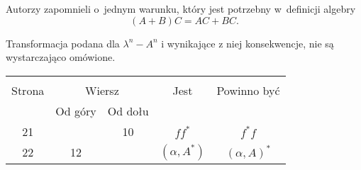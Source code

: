 \documentclass[a4paper,11pt]{article}
\begin{document}


\start {} Autorzy zapomnieli o~jednym warunku, który jest
potrzebny w~definicji algebry
\begin{equation}
  \label{eq:BRVolI-s01-01}
  ( A + B ) C = A C + B C.
\end{equation}

\vspace{\spaceFour}



\start {} Transformacja podana dla $\lambda^{ n } - A^{ n }$ i
wynikające z niej konsekwencje, nie są wystarczająco omówione.

\vspace{\spaceFour}







\begin{center}
  \begin{tabular}{|c|c|c|c|c|}
    \hline
    & \multicolumn{2}{c|}{} & & \\
    Strona & \multicolumn{2}{c|}{Wiersz} & Jest
                              & Powinno być \\ \cline{2-3}
    & Od góry & Od dołu & & \\
    \hline
    21  & & 10 & $ff^{ * }$ & $f^{ * }\! f$ \\
    22  & 12 & & $( \alpha, A^{ * } )$ & $( \alpha, A )^{ * }$ \\
    \hline
  \end{tabular}

\end{center}

\vspace{\spaceTwo}
\end{document}
